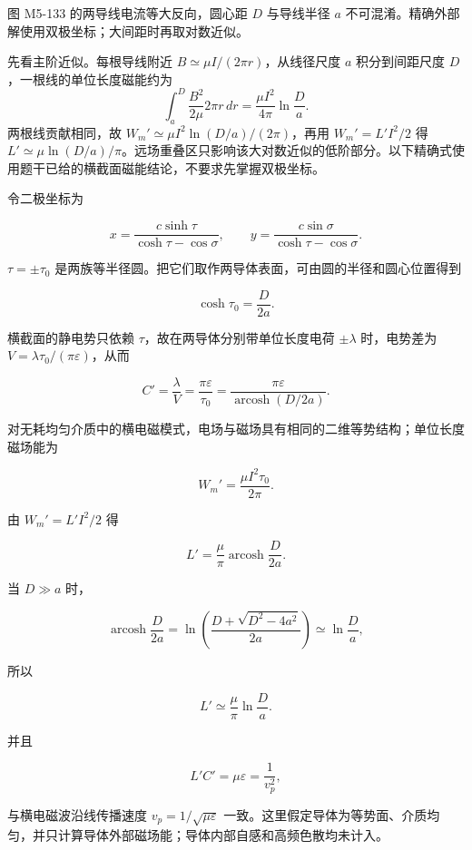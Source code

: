 图 M5-133 的两导线电流等大反向，圆心距 \(D\) 与导线半径 \(a\)
不可混淆。精确外部解使用双极坐标；大间距时再取对数近似。

先看主阶近似。每根导线附近 \(B\simeq\mu I/(2\pi r)\)，从线径尺度 \(a\)
积分到间距尺度 \(D\)，一根线的单位长度磁能约为 \[
\int_a^D\frac{B^2}{2\mu}2\pi r\,dr
=\frac{\mu I^2}{4\pi}\ln\frac Da.
\] 两根线贡献相同，故 \(W_m'\simeq\mu I^2\ln(D/a)/(2\pi)\)，再用
\(W_m'=L'I^2/2\) 得
\(L'\simeq\mu\ln(D/a)/\pi\)。远场重叠区只影响该大对数近似的低阶部分。以下精确式使用题干已给的横截面磁能结论，不要求先掌握双极坐标。

令二极坐标为

\[
x=\frac{c\sinh\tau}{\cosh\tau-\cos\sigma},
\qquad
y=\frac{c\sin\sigma}{\cosh\tau-\cos\sigma}.
\]

\(\tau=\pm\tau_0\)
是两族等半径圆。把它们取作两导体表面，可由圆的半径和圆心位置得到

\[
\boxed{\cosh\tau_0=\frac{D}{2a}}.
\]

横截面的静电势只依赖 \(\tau\)，故在两导体分别带单位长度电荷
\(\pm\lambda\) 时，电势差为 \(V=\lambda\tau_0/(\pi\varepsilon)\)，从而

\[
C'=\frac{\lambda}{V}=\frac{\pi\varepsilon}{\tau_0}
=\frac{\pi\varepsilon}{\operatorname{arcosh}(D/2a)}.
\]

对无耗均匀介质中的横电磁模式，电场与磁场具有相同的二维等势结构；单位长度磁场能为

\[
W_m'=\frac{\mu I^2\tau_0}{2\pi}.
\]

由 \(W_m'=L'I^2/2\) 得

\[
\boxed{
L'=\frac{\mu}{\pi}\operatorname{arcosh}\frac{D}{2a}}.
\]

当 \(D\gg a\) 时，

\[
\operatorname{arcosh}\frac{D}{2a}
=\ln\left(\frac{D+\sqrt{D^2-4a^2}}{2a}\right)
\simeq\ln\frac Da,
\]

所以

\[
\boxed{L'\simeq\frac\mu\pi\ln\frac Da}.
\]

并且

\[
L'C'=\mu\varepsilon=\frac1{v_p^2},
\]

与横电磁波沿线传播速度 \(v_p=1/\sqrt{\mu\varepsilon}\)
一致。这里假定导体为等势面、介质均匀，并只计算导体外部磁场能；导体内部自感和高频色散均未计入。

